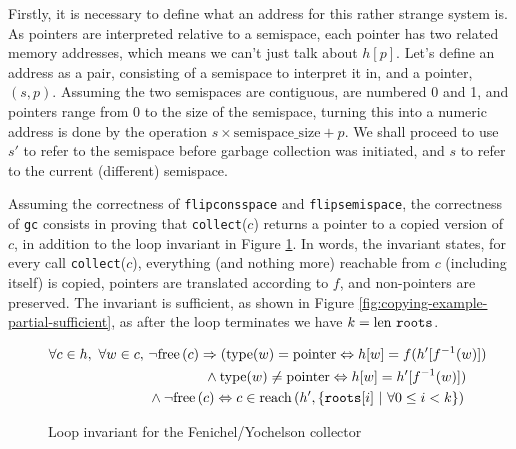Firstly, it is necessary to define what an address for this rather
strange system is. As pointers are interpreted relative to a
semispace, each pointer has two related memory addresses, which means
we can't just talk about $h[p]$. Let's define an address as a pair,
consisting of a semispace to interpret it in, and a pointer, $(s,
p)$. Assuming the two semispaces are contiguous, are numbered 0 and 1,
and pointers range from 0 to the size of the semispace, turning this
into a numeric address is done by the operation $s \times
\mathrm{semispace\_size} + p$. We shall proceed to use $s'$ to refer
to the semispace before garbage collection was initiated, and $s$ to
refer to the current (different) semispace.

Assuming the correctness of \texttt{flipconsspace} and
\texttt{flipsemispace}, the correctness of \texttt{gc} consists in
proving that \texttt{collect}($c$) returns a pointer to a copied
version of $c$, in addition to the loop invariant in Figure
\ref{fig:copying-example-partial-invariant}. In words, the invariant
states, for every call \texttt{collect}($c$), everything (and nothing
more) reachable from $c$ (including itself) is copied, pointers are
translated according to $f$, and non-pointers are preserved. The
invariant is sufficient, as shown in Figure
\ref{fig:copying-example-partial-sufficient}, as after the loop
terminates we have $k = \mathrm{len}~ \mathtt{roots}$.

\begin{figure}[t]
  \centering
  \begin{align*}
    \forall c \in h,\ \forall w \in c,\ &\lnot\mathrm{free}\left(c\right) \Rightarrow
    (\mathrm{type}(w) = \mathrm{pointer} \Leftrightarrow h[w] = f(h'[f^{-1}(w)])\\
    &\quad\quad\quad\quad \land \mathrm{type}(w) \neq \mathrm{pointer}
    \Leftrightarrow h[w] = h'[f^{-1}(w)])\\
    &\land \lnot\mathrm{free}\left(c\right) \Leftrightarrow c \in
    \mathrm{reach}\left(h', \{\mathtt{roots}[i]~|~\forall 0 \leq i < k\}\right)
  \end{align*}
  \captionsetup{format=default}
  \caption{Loop invariant for the Fenichel/Yochelson collector}
  \label{fig:copying-example-partial-invariant}
\end{figure}

